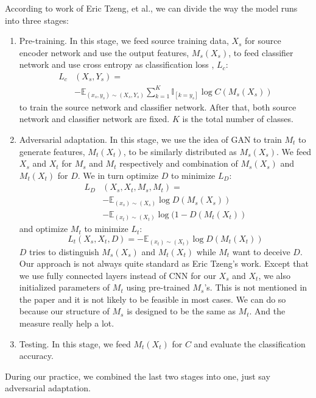 \documentclass[conference]{IEEEtran}
\begin{document}
According to work of Eric Tzeng, et al., we can divide the way the model runs into three stages:
\begin{enumerate}
  \item Pre-training. In this stage, we feed source training data, $X_{s}$ for source encoder network and use the output features, $M_s(X_{s})$, to feed classifier network and use cross entropy as classification loss , $L_{c}$:
      \begin{equation}\label{cls_loss}
      \begin{aligned}
        L_{c} & (X_{s}, Y_{s}) =  \\
        &-\mathbb{E}_{(x_s,y_s) \sim (X_s,Y_s)}
        \sum\limits_{k=1}^{K} \mathbb{I}_{[k=y_s]} \log C(M_s(X_{s}))
        \end{aligned}
      \end{equation}
       to train the source network and classifier network. After that, both source network and classifier network are fixed. $K$ is the total number of classes.
  \item Adversarial adaptation. In this stage, we use the idea of GAN to train $M_t$ to generate features, $M_t(X_{t})$, to be similarly distributed as $M_s(X_{s})$. We feed $X_s$ and $X_t$ for $M_s$ and $M_t$ respectively and combination of $M_s(X_{s})$ and $M_t(X_{t})$ for $D$. We in turn optimize $D$ to minimize $L_{D}$:
      \begin{equation}\label{LD}
        \begin{aligned}
        L_{D} & (X_{s}, X_{t}, M_s, M_t) =  \\
                                        &-\mathbb{E}_{(x_s) \sim (X_s)} \log D(M_s(X_{s})) \\
                                        &-\mathbb{E}_{(x_t) \sim (X_t)} \log (1 - D(M_t(X_{t}))
            \end{aligned}
      \end{equation}
      and optimize $M_t$ to minimize
      $L_{t}$:
      \begin{equation}\label{Lt}
        L_{t}(X_{s}, X_{t}, D) =
            -\mathbb{E}_{(x_t) \sim (X_t)} \log D(M_t(X_{t}))
      \end{equation}
      $D$ tries to distinguish $M_s(X_{s})$ and $M_t(X_{t})$ while $M_t$ want to deceive $D$. \\
      Our approach is not always quite standard as Eric Tzeng's work. Except that we use fully connected layers instead of CNN for our $X_s$ and $X_t$, we also initialized parameters of $M_t$ using pre-trained $M_s$'s. This is not mentioned in the paper and it is not likely to be feasible in most cases. We can do so because our structure of $M_s$ is designed to be the same as $M_t$. And the measure really help a lot.
  \item Testing. In this stage, we feed $M_t(X_t)$ for $C$ and evaluate the classification accuracy.
\end{enumerate}
    During our practice, we combined the last two stages into one, just say adversarial adaptation.
\end{document}
